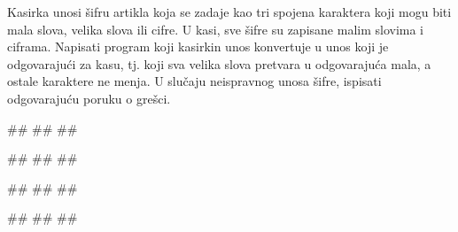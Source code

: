 \begin{Exercise}[label=KT_NG_11] 
Kasirka unosi šifru artikla koja se zadaje kao tri spojena karaktera koji mogu biti mala slova, velika slova ili cifre. 
U kasi, sve šifre su zapisane malim slovima i ciframa. Napisati program koji kasirkin unos konvertuje u unos
koji je odgovarajući za kasu, tj. koji sva velika slova pretvara u odgovarajuća mala, a ostale karaktere ne menja. 
U slučaju neispravnog unosa šifre, ispisati odgovarajuću poruku o grešci.

\begin{miditest}
\begin{upotreba}{1}
#\naslovInt#
##
##
\end{upotreba}
\end{miditest}
\begin{miditest}
\begin{upotreba}{2}
#\naslovInt#
##
##
\end{upotreba}
\end{miditest}

\begin{miditest}
\begin{upotreba}{3}
#\naslovInt#
##
##
\end{upotreba}
\end{miditest}
\begin{miditest}
\begin{upotreba}{4}
#\naslovInt#
##
##
\end{upotreba}
\end{miditest}
\end{Exercise}
\ifresenja
 \begin{Answer}[ref=KT_NG_11]
\end{Answer}
\fi




